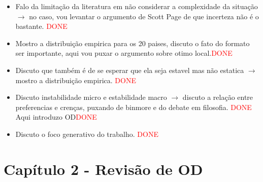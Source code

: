 \documentclass{article}
\begin{document}
\begin{itemize}
\item Falo da limitação da literatura em não considerar a complexidade da
  situação $\rightarrow$ no caso, vou levantar o argumento de Scott Page de que incerteza
  não é o bastante. \textcolor{red}{DONE}
\item Mostro a distribuição empirica para os 20 paises, discuto o fato do
  formato ser importante, aqui vou puxar o argumento sobre otimo local.\textcolor{red}{DONE}
\item Discuto que também é de se esperar que ela seja estavel mas não estatica
  $\rightarrow$ mostro a distribuição empirica. \textcolor{red}{DONE}
\item Discuto instabilidade micro e estabilidade macro $\rightarrow$ discuto a relação
  entre preferencias e crenças, puxando de binmore e do debate em filosofia. \textcolor{red}{DONE}
  Aqui introduzo OD\textcolor{red}{DONE}
\item Discuto o foco generativo do trabalho. \textcolor{red}{DONE}
\end{itemize}


\section*{Capítulo 2 - Revisão de OD }
\end{document}
